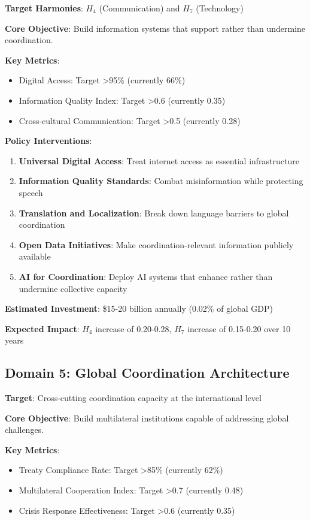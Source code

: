 \documentclass[12pt,letterpaper]{article}
\begin{document}
\textbf{Target Harmonies}: $H_4$ (Communication) and $H_7$ (Technology)

\textbf{Core Objective}: Build information systems that support rather than undermine coordination.

\textbf{Key Metrics}:
\begin{itemize}
    \item Digital Access: Target >95\% (currently 66\%)
    \item Information Quality Index: Target >0.6 (currently 0.35)
    \item Cross-cultural Communication: Target >0.5 (currently 0.28)
\end{itemize}

\textbf{Policy Interventions}:

\begin{enumerate}
    \item \textbf{Universal Digital Access}: Treat internet access as essential infrastructure
    \item \textbf{Information Quality Standards}: Combat misinformation while protecting speech
    \item \textbf{Translation and Localization}: Break down language barriers to global coordination
    \item \textbf{Open Data Initiatives}: Make coordination-relevant information publicly available
    \item \textbf{AI for Coordination}: Deploy AI systems that enhance rather than undermine collective capacity
\end{enumerate}

\textbf{Estimated Investment}: \$15-20 billion annually (0.02\% of global GDP)

\textbf{Expected Impact}: $H_4$ increase of 0.20-0.28, $H_7$ increase of 0.15-0.20 over 10 years

\subsection{Domain 5: Global Coordination Architecture}

\textbf{Target}: Cross-cutting coordination capacity at the international level

\textbf{Core Objective}: Build multilateral institutions capable of addressing global challenges.

\textbf{Key Metrics}:
\begin{itemize}
    \item Treaty Compliance Rate: Target >85\% (currently 62\%)
    \item Multilateral Cooperation Index: Target >0.7 (currently 0.48)
    \item Crisis Response Effectiveness: Target >0.6 (currently 0.35)
\end{itemize}
\end{document}
